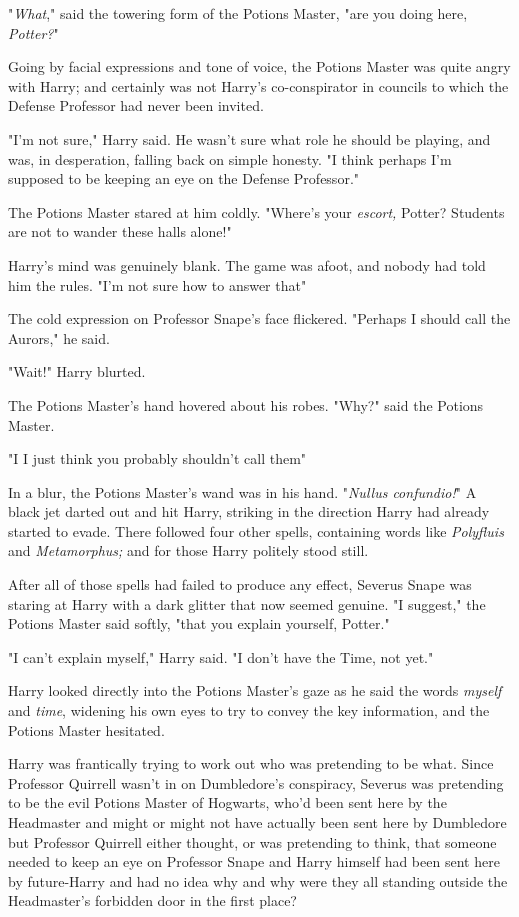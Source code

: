 "\emph{What}," said the towering form of the Potions Master, "are you doing
here, \emph{Potter?}"

Going by facial expressions and tone of voice, the Potions Master was quite
angry with Harry; and certainly was not Harry's co-conspirator in councils to
which the Defense Professor had never been invited.

"I'm not sure," Harry said. He wasn't sure what role he should be playing, and
was, in desperation, falling back on simple honesty. "I think perhaps I'm
supposed to be keeping an eye on the Defense Professor."

The Potions Master stared at him coldly. "Where's your \emph{escort,} Potter?
Students are not to wander these halls alone!"

Harry's mind was genuinely blank. The game was afoot, and nobody had told him
the rules. "I'm not sure how to answer that{\el}"

The cold expression on Professor Snape's face flickered. "Perhaps I should call
the Aurors," he said.

"Wait!" Harry blurted.

The Potions Master's hand hovered about his robes. "Why?" said the Potions
Master.

"I{\el} I just think you probably shouldn't call them{\el}"

In a blur, the Potions Master's wand was in his hand. "\emph{Nullus
confundio!}" A black jet darted out and hit Harry, striking in the direction
Harry had already started to evade. There followed four other spells,
containing words like \emph{Polyfluis} and \emph{Metamorphus;} and for those
Harry politely stood still.

After all of those spells had failed to produce any effect, Severus Snape was
staring at Harry with a dark glitter that now seemed genuine. "I suggest," the
Potions Master said softly, "that you explain yourself, Potter."

"I can't explain myself," Harry said. "I don't have the Time, not yet."

Harry looked directly into the Potions Master's gaze as he said the words
\emph{myself} and \emph{time}, widening his own eyes to try to convey the key
information, and the Potions Master hesitated.

Harry was frantically trying to work out who was pretending to be what. Since
Professor Quirrell wasn't in on Dumbledore's conspiracy, Severus was pretending
to be the evil Potions Master of Hogwarts, who'd been sent here by the
Headmaster{\el} and might or might not have actually been sent here by
Dumbledore{\el} but Professor Quirrell either thought, or was pretending to
think, that someone needed to keep an eye on Professor Snape{\el} and Harry
himself had been sent here by future-Harry and had no idea why{\el} and why
were they all standing outside the Headmaster's forbidden door in the first
place?

